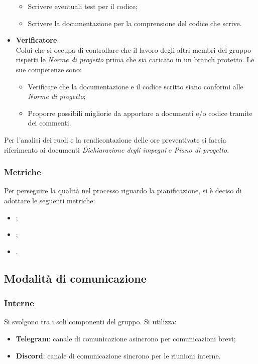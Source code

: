 \begin{itemize}
\begin{itemize}
              \item Scrivere eventuali test per il codice;
              \item Scrivere la documentazione per la comprensione del codice che scrive.
          \end{itemize}
    \item \textbf{Verificatore}\\
          Colui che si occupa di controllare che il lavoro degli altri membri del gruppo rispetti le \textit{Norme di progetto}
          prima che sia caricato in un branch protetto.
          Le sue competenze sono:
          \begin{itemize}
              \item Verificare che la documentazione e il codice scritto siano conformi alle
                    \textit{Norme di progetto};
              \item Proporre possibili migliorie da apportare a documenti e/o codice tramite dei
                    commenti.
          \end{itemize}
\end{itemize}

Per l'analisi dei ruoli e la rendicontazione delle ore preventivate si faccia
riferimento ai documenti \textit{Dichiarazione degli impegni} e \textit{Piano
    di progetto}.

\subsubsection{Metriche}
Per perseguire la qualità nel processo riguardo la pianificazione, si è deciso
di adottare le seguenti metriche:
\begin{itemize}
    \item {};
    \item {};
    \item {}.
\end{itemize}

\subsection{Modalità di comunicazione}
\subsubsection{Interne}
Si svolgono tra i soli componenti del gruppo. Si utilizza:
\begin{itemize}
    \item \textbf{Telegram}: canale di comunicazione asincrono per comunicazioni brevi;
    \item \textbf{Discord}: canale di comunicazione sincrono per le riunioni interne.
\end{itemize}
